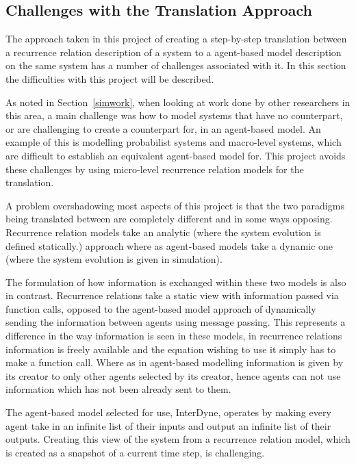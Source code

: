 \documentclass{article}
\begin{document}
\subsection{Challenges with the Translation Approach} \label{twoviewsapproach} 
The approach taken in this project of creating a step-by-step translation between a recurrence relation description of a system to a agent-based model description on the same system has a number of challenges associated with it. In this section the difficulties with this project will be described. 

As noted in Section~\ref{simwork}, when looking at work done by other researchers in this area, a main challenge was how to model systems that have no counterpart, or are challenging to create a counterpart for, in an agent-based model.
An example of this is modelling probabilist systems and macro-level systems, which are difficult to establish an equivalent agent-based model for. This project avoids these challenges by using micro-level recurrence relation models for the translation. 

A problem overshadowing most aspects of this project is that the two paradigms being translated between are completely different and in some ways opposing. Recurrence relation models take an analytic (where the system evolution is defined statically.) approach where as agent-based models take a dynamic one (where the system evolution is given in simulation).  

The formulation of how information is exchanged within these two models is also in contrast. Recurrence relations take a static view with information passed via function calls, opposed to the agent-based model approach of dynamically sending the information between agents using message passing. This represents a difference in the way information is seen in these models, in recurrence relations information is freely available and the equation wishing to use it simply has to make a function call. Where as in agent-based modelling information is given by its creator to only other agents selected by its creator, hence agents can not use information which has not been already sent to them.

The agent-based model selected for use, InterDyne, operates by making every agent take in an infinite list of their inputs and output an infinite list of their outputs. Creating this view of the system from a recurrence relation model, which is created as a snapshot of a current time step, is challenging. 
\end{document}
